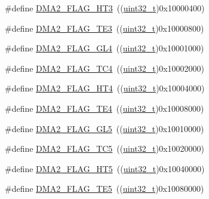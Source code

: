 \begin{DoxyCompactItemize}
\item 
\#define \hyperlink{group___d_m_a__flags__definition_ga1af48c549d9aa04e8161cb8b398ef39c}{D\+M\+A2\+\_\+\+F\+L\+A\+G\+\_\+\+H\+T3}~((\hyperlink{_p_e___types_8h_a33594304e786b158f3fb30289278f5af}{uint32\+\_\+t})0x10000400)
\item 
\#define \hyperlink{group___d_m_a__flags__definition_gacdf472c665395a07681a7d499ac0f0bb}{D\+M\+A2\+\_\+\+F\+L\+A\+G\+\_\+\+T\+E3}~((\hyperlink{_p_e___types_8h_a33594304e786b158f3fb30289278f5af}{uint32\+\_\+t})0x10000800)
\item 
\#define \hyperlink{group___d_m_a__flags__definition_ga624ff69707b76813a2170e4b1e0bda71}{D\+M\+A2\+\_\+\+F\+L\+A\+G\+\_\+\+G\+L4}~((\hyperlink{_p_e___types_8h_a33594304e786b158f3fb30289278f5af}{uint32\+\_\+t})0x10001000)
\item 
\#define \hyperlink{group___d_m_a__flags__definition_gad4f76b7a22233dbb9daaad448c431165}{D\+M\+A2\+\_\+\+F\+L\+A\+G\+\_\+\+T\+C4}~((\hyperlink{_p_e___types_8h_a33594304e786b158f3fb30289278f5af}{uint32\+\_\+t})0x10002000)
\item 
\#define \hyperlink{group___d_m_a__flags__definition_ga3dde40e2dbcdb12e4c1a2a2b5a8b3a60}{D\+M\+A2\+\_\+\+F\+L\+A\+G\+\_\+\+H\+T4}~((\hyperlink{_p_e___types_8h_a33594304e786b158f3fb30289278f5af}{uint32\+\_\+t})0x10004000)
\item 
\#define \hyperlink{group___d_m_a__flags__definition_gac1178b804cad45fe82236dbd2c25cc64}{D\+M\+A2\+\_\+\+F\+L\+A\+G\+\_\+\+T\+E4}~((\hyperlink{_p_e___types_8h_a33594304e786b158f3fb30289278f5af}{uint32\+\_\+t})0x10008000)
\item 
\#define \hyperlink{group___d_m_a__flags__definition_gab0468b7a6e2fbdd5428da87252865623}{D\+M\+A2\+\_\+\+F\+L\+A\+G\+\_\+\+G\+L5}~((\hyperlink{_p_e___types_8h_a33594304e786b158f3fb30289278f5af}{uint32\+\_\+t})0x10010000)
\item 
\#define \hyperlink{group___d_m_a__flags__definition_ga5ba4dce652a1a29bedbd7d8dc35ca4ec}{D\+M\+A2\+\_\+\+F\+L\+A\+G\+\_\+\+T\+C5}~((\hyperlink{_p_e___types_8h_a33594304e786b158f3fb30289278f5af}{uint32\+\_\+t})0x10020000)
\item 
\#define \hyperlink{group___d_m_a__flags__definition_ga23aabf34428e04d7b46368e0b595a4d5}{D\+M\+A2\+\_\+\+F\+L\+A\+G\+\_\+\+H\+T5}~((\hyperlink{_p_e___types_8h_a33594304e786b158f3fb30289278f5af}{uint32\+\_\+t})0x10040000)
\item 
\#define \hyperlink{group___d_m_a__flags__definition_gae57659b4349d03eb70db63bb2aa40505}{D\+M\+A2\+\_\+\+F\+L\+A\+G\+\_\+\+T\+E5}~((\hyperlink{_p_e___types_8h_a33594304e786b158f3fb30289278f5af}{uint32\+\_\+t})0x10080000)

\end{DoxyCompactItemize}
